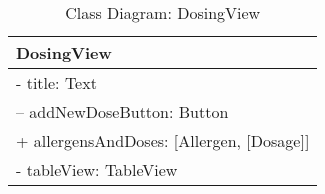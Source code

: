 \begin{table}[H]
\centering
\caption{Class Diagram: DosingView}

\hspace{1em}
\renewcommand{\arraystretch}{1.7}

\begin{tabular}{|l|}
\hline
\textbf{DosingView} \\
\hline
- title: Text \\
– addNewDoseButton: Button \\
+ allergensAndDoses: [Allergen, [Dosage]] \\
- tableView: TableView \\
\hline
\end{tabular}
\end{table}
